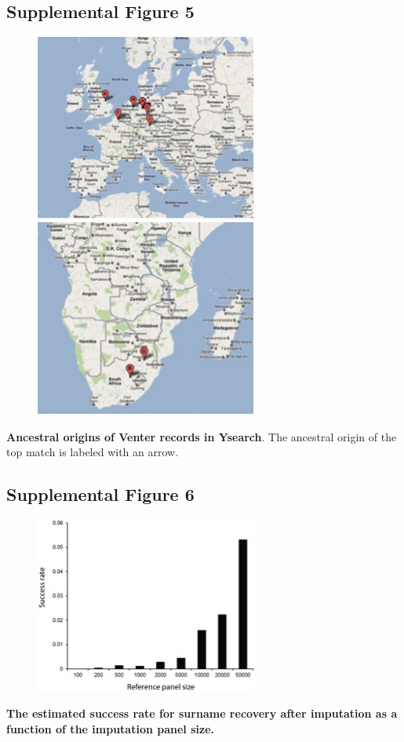 \pagebreak
\subsection{Supplemental Figure 5}
\begin{figure}[h!]
\centering
\label{fig:sursup5}
\includegraphics[width=0.65\textwidth]{Figures/App1/SuppFig5a.jpg}
\includegraphics[width=0.65\textwidth]{Figures/App1/SuppFig5b.jpg}
\end{figure}
\textbf{Ancestral origins of Venter records in Ysearch}. The ancestral origin of the top match is labeled with an arrow.

\pagebreak
\subsection{Supplemental Figure 6}
\begin{figure}[h!]
\centering
\label{fig:sursup6}
\includegraphics[width=0.65\textwidth]{Figures/App1/SuppFig6.jpg}
\end{figure}
\textbf{The estimated success rate for surname recovery after imputation as a function of the imputation panel size.}

